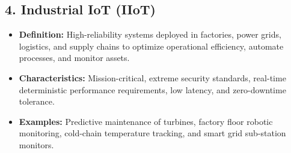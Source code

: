 \subsection{4. Industrial IoT (IIoT)}
\begin{itemize}
  \item   \textbf{Definition:} High-reliability systems deployed in factories, power grids, logistics, and supply chains to optimize operational efficiency, automate processes, and monitor assets.
  \item   \textbf{Characteristics:} Mission-critical, extreme security standards, real-time deterministic performance requirements, low latency, and zero-downtime tolerance.
  \item   \textbf{Examples:} Predictive maintenance of turbines, factory floor robotic monitoring, cold-chain temperature tracking, and smart grid sub-station monitors.
\end{itemize}

